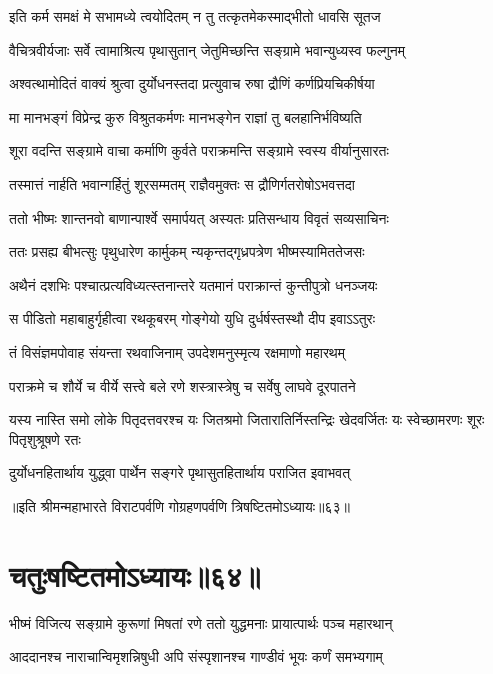 \twolineshloka
{इति कर्म समक्षं मे सभामध्ये त्वयोदितम्}
{न तु तत्कृतमेकस्माद्भीतो धावसि सूतज}


\twolineshloka
{वैचित्रवीर्यजाः सर्वे त्वामाश्रित्य पृथासुतान्}
{जेतुमिच्छन्ति सङ्ग्रामे भवान्युध्यस्व फल्गुनम्}


\twolineshloka
{अश्वत्थामोदितं वाक्यं श्रुत्वा दुर्योधनस्तदा}
{प्रत्युवाच रुषा द्रौणिं कर्णप्रियचिकीर्षया}


\twolineshloka
{मा मानभङ्गं विप्रेन्द्र कुरु विश्रुतकर्मणः}
{मानभङ्गेन राज्ञां तु बलहानिर्भविष्यति}


\twolineshloka
{शूरा वदन्ति सङ्ग्रामे वाचा कर्माणि कुर्वते}
{पराक्रमन्ति सङ्ग्रामे स्वस्य वीर्यानुसारतः}


\twolineshloka
{तस्मात्तं नार्हति भवान्गर्हितुं शूरसम्मतम्}
{राज्ञैवमुक्तः स द्रौणिर्गतरोषोऽभवत्तदा}


\twolineshloka
{ततो भीष्मः शान्तनवो बाणान्पार्श्वे समार्पयत्}
{अस्यतः प्रतिसन्धाय विवृतं सव्यसाचिनः}


\twolineshloka
{ततः प्रसह्य बीभत्सुः पृथुधारेण कार्मुकम्}
{न्यकृन्तद्गृध्रपत्रेण भीष्मस्यामिततेजसः}


\twolineshloka
{अथैनं दशभिः पश्चात्प्रत्यविध्यत्स्तनान्तरे}
{यतमानं पराक्रान्तं कुन्तीपुत्रो धनञ्जयः}


\twolineshloka
{स पीडितो महाबाहुर्गृहीत्वा रथकूबरम्}
{गोङ्गेयो युधि दुर्धर्षस्तस्थौ दीप इवाऽऽतुरः}


\twolineshloka
{तं विसंज्ञमपोवाह संयन्ता रथवाजिनाम्}
{उपदेशमनुस्मृत्य रक्षमाणो महारथम्}


\twolineshloka
{पराक्रमे च शौर्ये च वीर्ये सत्त्वे बले रणे}
{शस्त्रास्त्रेषु च सर्वेषु लाघवे दूरपातने}


\threelineshloka
{यस्य नास्ति समो लोके पितृदत्तवरश्च यः}
{जितश्रमो जितारातिर्निस्तन्द्रिः खेदवर्जितः}
{यः स्वेच्छामरणः शूरः पितृशुश्रूषणे रतः}


\twolineshloka
{दुर्योधनहितार्थाय युद्ध्वा पार्थेन सङ्गरे}
{पृथासुतहितार्थाय पराजित इवाभवत्}

॥इति श्रीमन्महाभारते विराटपर्वणि गोग्रहणपर्वणि त्रिषष्टितमोऽध्यायः॥६३॥

\chapter{चतुःषष्टितमोऽध्यायः॥६४॥}

\twolineshloka
{भीष्मं विजित्य सङ्ग्रामे कुरूणां मिषतां रणे}
{ततो युद्धमनाः प्रायात्पार्थः पञ्च महारथान्}


\twolineshloka
{आददानश्च नाराचान्विमृशन्निषुधी अपि}
{संस्पृशानश्च गाण्डीवं भूयः कर्णं समभ्यगाम्}

